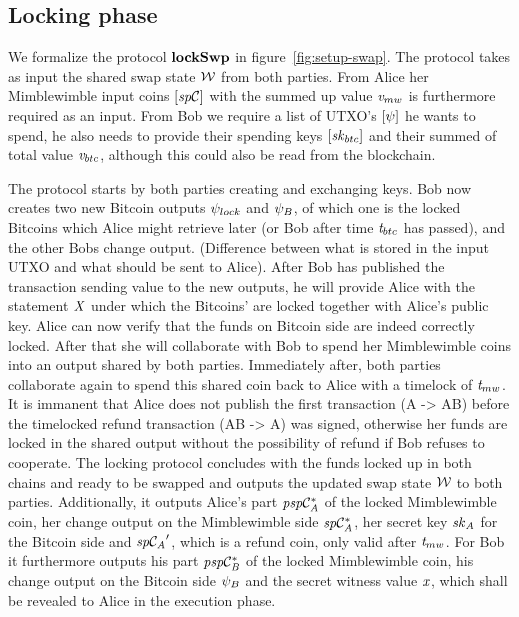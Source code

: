 \subsection{Locking phase}\label{subsec:atom:locking}

We formalize the protocol $\mathbf{lockSwp}$ in figure~\ref{fig:setup-swap}.
The protocol takes as input the shared swap state $\mathcal{W}$ from both parties.
From Alice her Mimblewimble input coins $[\mathit{sp}\mathcal{C}]$ with the summed up value $\mathit{v}_{mw}$ is furthermore required as an input.
From Bob we require a list of UTXO's $[\psi]$ he wants to spend, he also needs to provide their spending keys $[\mathit{sk}_{btc}]$ and their summed of total value $\mathit{v}_{btc}$, although this could also be read from the blockchain.

The protocol starts by both parties creating and exchanging keys.
Bob now creates two new Bitcoin outputs $\psi_{lock}$ and $\psi_{B}$, of which one is the locked Bitcoins which Alice might retrieve later (or Bob after time $\mathit{t}_{btc}$ has passed), and the other Bobs change output. (Difference between what is stored in the input UTXO and what should be sent to Alice).
After Bob has published the transaction sending value to the new outputs, he will provide Alice with the statement $\mathit{X}$ under which the Bitcoins' are locked together with Alice's public key.
Alice can now verify that the funds on Bitcoin side are indeed correctly locked.
After that she will collaborate with Bob to spend her Mimblewimble coins into an output shared by both parties.
Immediately after, both parties collaborate again to spend this shared coin back to Alice with a timelock of $\mathit{t}_{mw}$.
It is immanent that Alice does not publish the first transaction (A -> AB) before the timelocked refund transaction (AB -> A) was signed, otherwise her funds are locked in the shared output without the possibility of refund if Bob refuses to cooperate.
The locking protocol concludes with the funds locked up in both chains and ready to be swapped and outputs the updated swap state $\mathcal{W}$ to both parties.
Additionally, it outputs Alice's part $\mathit{psp}\mathcal{C}_{\mathit{A}}^*$ of the locked Mimblewimble coin, her change output on the Mimblewimble side $\mathit{sp}\mathcal{C}_{\mathit{A}}^*$, her secret key $\mathit{sk}_{\mathit{A}}$ for the Bitcoin side and ${\mathit{sp}\mathcal{C}_{\mathit{A}}}'$, which is a refund coin, only valid after $\mathit{t}_{mw}$.
For Bob it furthermore outputs his part $\mathit{psp}\mathcal{C}_{\mathit{B}}^*$ of the locked Mimblewimble coin, his change output on the Bitcoin side $\psi_{B}$ and the secret witness value $\mathit{x}$, which shall be revealed to Alice in the execution phase.

